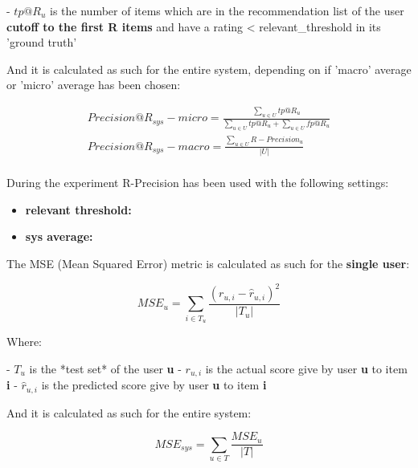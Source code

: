     - $tp@R_u$ is the number of items which are in the recommendation list of the user
      \textbf{cutoff to the first R items} and have a rating < relevant_threshold in its 'ground truth'

\hfill\break

And it is calculated as such for the entire system, depending on if 'macro' average or 'micro' average has been
chosen:

    \begin{gather*}
        Precision@R_{sys} - micro = \frac{\sum_{u \in U} tp@R_u}{\sum_{u \in U} tp@R_u + \sum_{u \in U} fp@R_u}\\
        Precision@R_{sys} - macro = \frac{\sum_{u \in U} R-Precision_u}{|U|}\\
    \end{gather*}

\hfill\break

During the experiment R-Precision has been used with the following settings:
\begin{itemize}
    \item \textbf{relevant threshold: }
    \item \textbf{sys average:  }
\end{itemize}





The MSE (Mean Squared Error) metric is calculated as such for the \textbf{single user}:

    \[
    MSE_u = \sum_{i \in T_u} \frac{(r_{u,i} - \hat{r}_{u,i})^2}{|T_u|}
    \]

    Where:

    - $T_u$ is the *test set* of the user \textbf{u}
    - $r_{u, i}$ is the actual score give by user \textbf{u} to item \textbf{i}
    - $\hat{r}_{u, i}$ is the predicted score give by user \textbf{u} to item \textbf{i}

\hfill\break

And it is calculated as such for the entire system:

    \[
    MSE_{sys} = \sum_{u \in T} \frac{MSE_u}{|T|}
    \]

